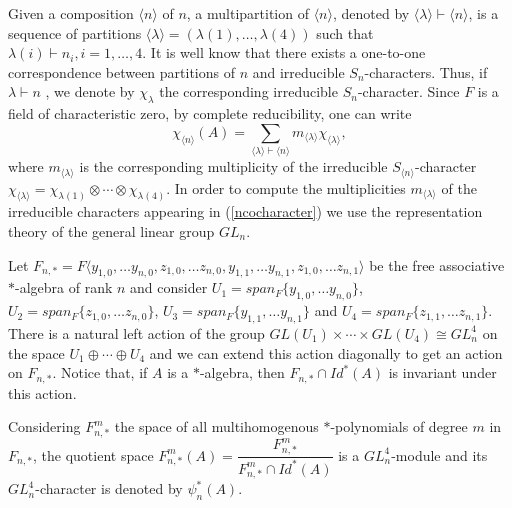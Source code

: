 \documentclass[11pt]{amsart}
\theoremstyle{definition}
\theoremstyle{remark}
\begin{document}
	Given a composition $\langle n\rangle$ of $n$, a multipartition of $\langle n\rangle$, denoted by $\langle \lambda \rangle\vdash \langle n\rangle$, is a sequence of partitions $\langle \lambda\rangle=(\lambda(1),\ldots, \lambda(4))$ such that $\lambda(i)\vdash n_i,i=1,\ldots, 4$. It is well know that there exists a one-to-one correspondence between partitions of $n$ and irreducible $S_n$-characters. Thus, if $\lambda\vdash n$ , we denote by $\chi_{\lambda}$ the corresponding irreducible $S_n$-character.
	Since $F$ is a field of characteristic zero, by complete reducibility, one can write \begin{equation}\label{ncocharacter}
		\chi_{\langle n\rangle}(A)=\displaystyle \sum_{\langle \lambda \rangle\vdash \langle n\rangle} m_{\langle \lambda \rangle}\chi_{\langle \lambda \rangle},
	\end{equation} where $m_{\langle \lambda \rangle}$ is the corresponding multiplicity of the irreducible $S_{\langle n \rangle}$-character $\chi_{\langle \lambda \rangle}=\chi_{\lambda(1)}\otimes \cdots \otimes \chi_{\lambda(4)}$. In order to compute the multiplicities $m_{\langle \lambda \rangle}$ of the
	irreducible characters appearing in (\ref{ncocharacter}) we use the
	re\-presentation theory of the general linear group $GL_n$.

	Let $F_{n,*}=F\langle y_{1,0},\ldots y_{n,0},z_{1,0},\ldots z_{n,0}, y_{1,1},\ldots y_{n,1}, z_{1,0},\ldots z_{n,1}\rangle$ be the free associative $*$-algebra of rank $n$ and consider $U_1=span_F\{{y_{1,0},\ldots y_{n,0}}\}$, $U_2=span_F\{{z_{1,0},\ldots z_{n,0}}\}$, $U_3=span_F\{{y_{1,1},\ldots y_{n,1}}\}$ and $U_4=span_F\{{z_{1,1},\ldots z_{n,1}}\}.$ There is a natural left action of the group $GL(U_1)\times \cdots\times GL(U_4)\cong GL_n^4$ on the space $U_1\oplus \cdots\oplus U_4$ and we can extend this action diagonally to get an action on $F_{n,*}$. Notice that, if $A$ is a $*$-algebra, then $F_{n,*}\cap Id^*(A)$ is invariant under this action.
	
	Considering $F^m_{n,*}$ the space of all multihomogenous $*$-polynomials of degree $m$ in $F_{n,*}$, the quotient space $F^m_{n,*}(A)=\dfrac{F^m_{n,*}}{F^m_{n,*}\cap Id^*(A)}$ is a $GL_n^4$-module and its $GL_n^4$-character is denoted by $\psi_n^{*}(A)$.
	
\end{document}
